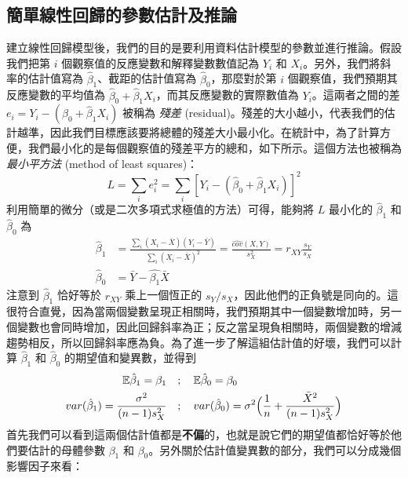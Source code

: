     \subsection{簡單線性回歸的參數估計及推論}

    建立線性回歸模型後，我們的目的是要利用資料估計模型的參數並進行推論。假設我們把第 $i$ 個觀察值的反應變數和解釋變數數值記為 $Y_i$ 和 $X_i$。另外，我們將斜率的估計值寫為 $\hat{\beta}_1$、截距的估計值寫為 $\hat{\beta}_0$，那麼對於第 $i$ 個觀察值，我們預期其反應變數的平均值為 $\hat{\beta}_0 + \hat{\beta}_1 X_i$，而其反應變數的實際數值為 $Y_i$。這兩者之間的差 $e_i = Y_i - (\hat{\beta}_0 + \hat{\beta}_1 X_i)$ 被稱為 \textit{殘差} (residual)。殘差的大小越小，代表我們的估計越準，因此我們目標應該要將總體的殘差大小最小化。在統計中，為了計算方便，我們最小化的是每個觀察值的殘差平方的總和，如下所示。這個方法也被稱為\textit{最小平方法} (method of least squares)：
    \smallskip
    \[L = \sum_i e_i^2 = \sum_i  [Y_i - (\hat{\beta}_0 + \hat{\beta}_1 X_i)]^2\]
    \smallskip
    利用簡單的微分（或是二次多項式求極值的方法）可得，能夠將 $L$ 最小化的 $\hat{\beta}_1$ 和 $\hat{\beta}_0$ 為
    \smallskip
    \begin{align*}
        \hat{\beta}_1 &= \frac{\sum_i (X_i - \bar{X})(Y_i - \bar{Y})}{\sum_i (X_i-\bar{X})^2} = \frac{\widehat{cov}(X,Y)}{s_X^2} = r_{XY}\frac{s_Y}{s_X}\\
        \hat{\beta}_0 &= \bar{Y} - \hat{\beta_1}\bar{X}
    \end{align*}
    \smallskip
    注意到 $\hat{\beta}_1$ 恰好等於 $r_{XY}$ 乘上一個恆正的 $s_Y / s_X$，因此他們的正負號是同向的。這很符合直覺，因為當兩個變數呈現正相關時，我們預期其中一個變數增加時，另一個變數也會同時增加，因此回歸斜率為正；反之當呈現負相關時，兩個變數的增減趨勢相反，所以回歸斜率應為負。為了進一步了解這組估計值的好壞，我們可以計算 $\hat{\beta}_1$ 和 $\hat{\beta}_0$ 的期望值和變異數，並得到
    \smallskip
    \begin{align*}
        \mathbb{E}\hat{\beta}_1 = \beta_1 \quad &; \quad \mathbb{E}\hat{\beta}_0 = \beta_0\\
        var(\hat{\beta}_1) = \frac{\sigma^2}{(n-1)s_X^2} \quad &; \quad var(\hat{\beta}_0) = \sigma^2\Big(\frac{1}{n} + \frac{\bar{X}^2}{(n-1)s_X^2}\Big)
    \end{align*}
    \smallskip
    首先我們可以看到這兩個估計值都是\textbf{不偏}的，也就是說它們的期望值都恰好等於他們要估計的母體參數 $\beta_1$ 和 $\beta_0$。另外關於估計值變異數的部分，我們可以分成幾個影響因子來看：
